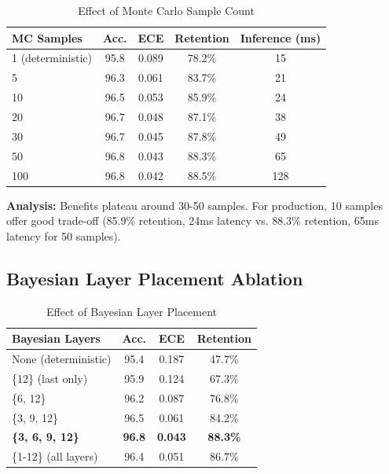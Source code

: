 \documentclass[12pt,a4paper]{article}
\theoremstyle{definition}
\begin{document}
\begin{table}[H]
\caption{Effect of Monte Carlo Sample Count}
\label{tab:mc_ablation}
\centering
\small
\begin{tabular}{@{}lcccc@{}}
\toprule
\textbf{MC Samples} & \textbf{Acc.} & \textbf{ECE} & \textbf{Retention} & \textbf{Inference (ms)} \\
\midrule
1 (deterministic) & 95.8 & 0.089 & 78.2\% & 15 \\
5 & 96.3 & 0.061 & 83.7\% & 21 \\
10 & 96.5 & 0.053 & 85.9\% & 24 \\
20 & 96.7 & 0.048 & 87.1\% & 38 \\
30 & 96.7 & 0.045 & 87.8\% & 49 \\
50 & 96.8 & 0.043 & 88.3\% & 65 \\
100 & 96.8 & 0.042 & 88.5\% & 128 \\
\bottomrule
\end{tabular}
\end{table}

\textbf{Analysis:} Benefits plateau around 30-50 samples. For production, 10 samples offer good trade-off (85.9\% retention, 24ms latency vs. 88.3\% retention, 65ms latency for 50 samples).

\subsection{Bayesian Layer Placement Ablation}

\begin{table}[H]
\caption{Effect of Bayesian Layer Placement}
\label{tab:layer_ablation}
\centering
\small
\begin{tabular}{@{}lccc@{}}
\toprule
\textbf{Bayesian Layers} & \textbf{Acc.} & \textbf{ECE} & \textbf{Retention} \\
\midrule
None (deterministic) & 95.4 & 0.187 & 47.7\% \\
\{12\} (last only) & 95.9 & 0.124 & 67.3\% \\
\{6, 12\} & 96.2 & 0.087 & 76.8\% \\
\{3, 9, 12\} & 96.5 & 0.061 & 84.2\% \\
\textbf{\{3, 6, 9, 12\}} & \textbf{96.8} & \textbf{0.043} & \textbf{88.3\%} \\
\{1-12\} (all layers) & 96.4 & 0.051 & 86.7\% \\
\bottomrule
\end{tabular}
\end{table}
\end{document}
